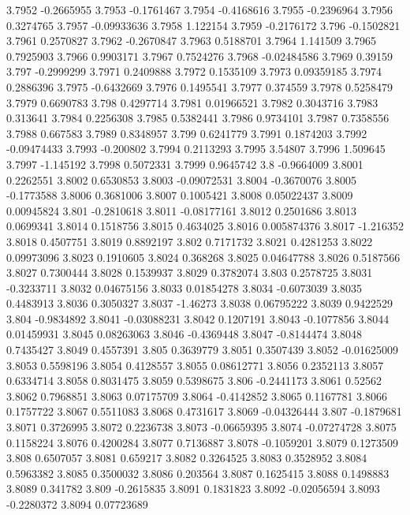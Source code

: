 3.7952  -0.2665955
3.7953  -0.1761467
3.7954  -0.4168616
3.7955  -0.2396964
3.7956  0.3274765
3.7957  -0.09933636
3.7958  1.122154
3.7959  -0.2176172
3.796  -0.1502821
3.7961  0.2570827
3.7962  -0.2670847
3.7963  0.5188701
3.7964  1.141509
3.7965  0.7925903
3.7966  0.9903171
3.7967  0.7524276
3.7968  -0.02484586
3.7969  0.39159
3.797  -0.2999299
3.7971  0.2409888
3.7972  0.1535109
3.7973  0.09359185
3.7974  0.2886396
3.7975  -0.6432669
3.7976  0.1495541
3.7977  0.374559
3.7978  0.5258479
3.7979  0.6690783
3.798  0.4297714
3.7981  0.01966521
3.7982  0.3043716
3.7983  0.313641
3.7984  0.2256308
3.7985  0.5382441
3.7986  0.9734101
3.7987  0.7358556
3.7988  0.667583
3.7989  0.8348957
3.799  0.6241779
3.7991  0.1874203
3.7992  -0.09474433
3.7993  -0.200802
3.7994  0.2113293
3.7995  3.54807
3.7996  1.509645
3.7997  -1.145192
3.7998  0.5072331
3.7999  0.9645742
3.8  -0.9664009
3.8001  0.2262551
3.8002  0.6530853
3.8003  -0.09072531
3.8004  -0.3670076
3.8005  -0.1773588
3.8006  0.3681006
3.8007  0.1005421
3.8008  0.05022437
3.8009  0.00945824
3.801  -0.2810618
3.8011  -0.08177161
3.8012  0.2501686
3.8013  0.0699341
3.8014  0.1518756
3.8015  0.4634025
3.8016  0.005874376
3.8017  -1.216352
3.8018  0.4507751
3.8019  0.8892197
3.802  0.7171732
3.8021  0.4281253
3.8022  0.09973096
3.8023  0.1910605
3.8024  0.368268
3.8025  0.04647788
3.8026  0.5187566
3.8027  0.7300444
3.8028  0.1539937
3.8029  0.3782074
3.803  0.2578725
3.8031  -0.3233711
3.8032  0.04675156
3.8033  0.01854278
3.8034  -0.6073039
3.8035  0.4483913
3.8036  0.3050327
3.8037  -1.46273
3.8038  0.06795222
3.8039  0.9422529
3.804  -0.9834892
3.8041  -0.03088231
3.8042  0.1207191
3.8043  -0.1077856
3.8044  0.01459931
3.8045  0.08263063
3.8046  -0.4369448
3.8047  -0.8144474
3.8048  0.7435427
3.8049  0.4557391
3.805  0.3639779
3.8051  0.3507439
3.8052  -0.01625009
3.8053  0.5598196
3.8054  0.4128557
3.8055  0.08612771
3.8056  0.2352113
3.8057  0.6334714
3.8058  0.8031475
3.8059  0.5398675
3.806  -0.2441173
3.8061  0.52562
3.8062  0.7968851
3.8063  0.07175709
3.8064  -0.4142852
3.8065  0.1167781
3.8066  0.1757722
3.8067  0.5511083
3.8068  0.4731617
3.8069  -0.04326444
3.807  -0.1879681
3.8071  0.3726995
3.8072  0.2236738
3.8073  -0.06659395
3.8074  -0.07274728
3.8075  0.1158224
3.8076  0.4200284
3.8077  0.7136887
3.8078  -0.1059201
3.8079  0.1273509
3.808  0.6507057
3.8081  0.659217
3.8082  0.3264525
3.8083  0.3528952
3.8084  0.5963382
3.8085  0.3500032
3.8086  0.203564
3.8087  0.1625415
3.8088  0.1498883
3.8089  0.341782
3.809  -0.2615835
3.8091  0.1831823
3.8092  -0.02056594
3.8093  -0.2280372
3.8094  0.07723689

